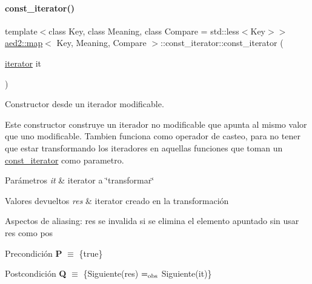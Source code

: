\mbox{\label{classaed2_1_1map_1_1const__iterator_ab7924d90cbf6d19bec62514d10b62fb3_ab7924d90cbf6d19bec62514d10b62fb3}} 
\paragraph{\texorpdfstring{const\+\_\+iterator()}{const\_iterator()}\hspace{0.1cm}{\footnotesize\ttfamily [2/3]}}
{\footnotesize\ttfamily template$<$class Key, class Meaning, class Compare = std\+::less$<$\+Key$>$$>$ \\
\hyperlink{classaed2_1_1map}{aed2\+::map}$<$ Key, Meaning, Compare $>$\+::const\+\_\+iterator\+::const\+\_\+iterator (\begin{DoxyParamCaption}\item[{\hyperlink{classaed2_1_1map_1_1iterator}{iterator}}]{it }\end{DoxyParamCaption})\hspace{0.3cm}{\ttfamily [inline]}}



Constructor desde un iterador modificable. 

Este constructor construye un iterador no modificable que apunta al mismo valor que uno modificable. Tambien funciona como operador de casteo, para no tener que estar transformando los iteradores en aquellas funciones que toman un {\ttfamily \hyperlink{classaed2_1_1map_1_1const__iterator}{const\+\_\+iterator}} como parametro.


\begin{DoxyParams}{Parámetros}
{\em it} & iterator a \char`\"{}transformar\char`\"{} \\
\hline
\end{DoxyParams}

\begin{DoxyRetVals}{Valores devueltos}
{\em res} & iterator creado en la transformación\\
\hline
\end{DoxyRetVals}
\begin{DoxyParagraph}{Aspectos de aliasing\+:}
res se invalida si se elimina el elemento apuntado sin usar res como pos
\end{DoxyParagraph}
\begin{DoxyPrecond}{Precondición}
{\bfseries P} $\equiv$ \{true\} 
\end{DoxyPrecond}
\begin{DoxyPostcond}{Postcondición}
{\bfseries Q} $\equiv$ \{Siguiente(res) $=_{\rm obs}$ Siguiente(it)\}
\end{DoxyPostcond}

